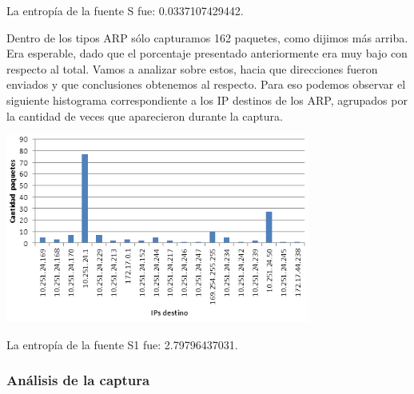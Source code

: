 La entrop\'ia de la fuente S fue: 0.0337107429442.\newline

Dentro de los tipos ARP s\'olo capturamos 162 paquetes, como dijimos m\'as arriba. Era esperable, dado que el porcentaje presentado anteriormente era muy bajo con respecto al total. \newline
Vamos a analizar sobre estos, hacia que direcciones fueron enviados y que conclusiones obtenemos al respecto. Para eso podemos observar el siguiente histograma correspondiente a los IP destinos de los ARP, agrupados por la cantidad de veces que aparecieron durante la captura.

\begin{center}
\includegraphics[width=0.75\textwidth]{exp1-graficos/grafico2exp1.png}
\end{center}

La entrop\'ia de la fuente S1 fue: 2.79796437031.


\subsubsection{An\'alisis de la captura}






